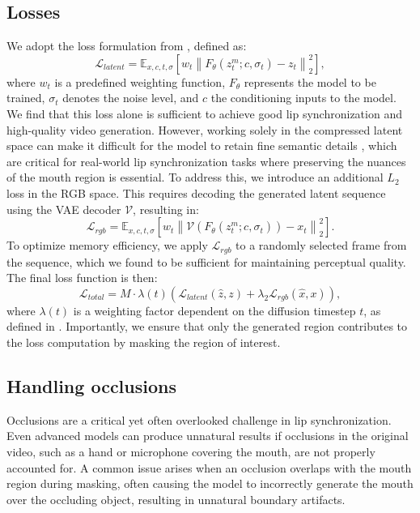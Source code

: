 \subsection{Losses}

We adopt the loss formulation from \cite{karras2022elucidatingdesignspacediffusionbased}, defined as:
\begin{equation}
    \mathcal{L}_{latent} = \mathbb{E}_{x, c, t, \sigma} \left[w_t \left\|F_{\theta}(z^m_t; c, \sigma_t) - z_t\right\|_2^2\right],
\end{equation}
where $w_t$ is a predefined weighting function, $F_{\theta}$ represents the model to be trained, $\sigma_t$ denotes the noise level, and $c$ the conditioning inputs to the model.
We find that this loss alone is sufficient to achieve good lip synchronization and high-quality video generation. However, working solely in the compressed latent space can make it difficult for the model to retain fine semantic details \cite{show1}, which are critical for real-world lip synchronization tasks where preserving the nuances of the mouth region is essential. To address this, we introduce an additional $L_2$  loss in the RGB space. This requires decoding the generated latent sequence using the VAE decoder $\mathcal{V}$, resulting in:
\begin{equation}
    \mathcal{L}_{rgb} = \mathbb{E}_{x, c, t, \sigma} \left[w_t \left\|\mathcal{V}(F_{\theta}(z^m_t; c, \sigma_t)) - x_t\right\|_2^2\right].
\end{equation}
To optimize memory efficiency, we apply $\mathcal{L}_{rgb}$ to a randomly selected frame from the sequence, which we found to be sufficient for maintaining perceptual quality.
The final loss function is then:
\begin{equation}
    \mathcal{L}_{total} = M \cdot \lambda(t)(\mathcal{L}_{latent}(\hat{z},z) + \lambda_2 \mathcal{L}_{rgb}(\hat{x},x)),
\end{equation} 
where $\lambda(t)$ is a weighting factor dependent on the diffusion timestep  $t$, as defined in \cite{karras2022elucidatingdesignspacediffusionbased}. Importantly, we ensure that only the generated region contributes to the loss computation by masking the region of interest.

\subsection{Handling occlusions}
\label{sec:occlusions}

Occlusions are a critical yet often overlooked challenge in lip synchronization. Even advanced models can produce unnatural results if occlusions in the original video, such as a hand or microphone covering the mouth, are not properly accounted for. A common issue arises when an occlusion overlaps with the mouth region during masking, often causing the model to incorrectly generate the mouth over the occluding object, resulting in unnatural boundary artifacts.

